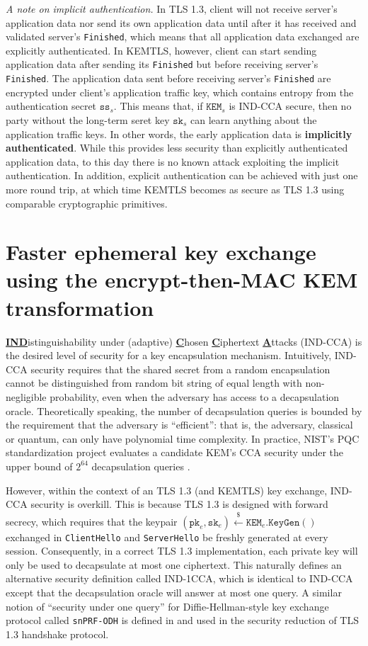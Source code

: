 \documentclass[letterpaper,12pt,titlepage,oneside,final]{book}
\newcommand{\kem}{\texttt{KEM}}
\newcommand{\pk}{\texttt{pk}}
\newcommand{\sk}{\texttt{sk}}
\newcommand{\leftsample}{\stackrel{\$}{\leftarrow}}
\begin{document}
\emph{A note on implicit authentication.} In TLS 1.3, client will not receive server's application data nor send its own application data until after it has received and validated server's \texttt{Finished}, which means that all application data exchanged are explicitly authenticated.
In KEMTLS, however, client can start sending application data after sending its \texttt{Finished} but before receiving server's \texttt{Finished}.
The application data sent before receiving server's \texttt{Finished} are encrypted under client's application traffic key, which contains entropy from the authentication secret $\texttt{ss}_s$.
This means that, if $\kem_s$ is IND-CCA secure, then no party without the long-term seret key $\sk_s$ can learn anything about the application traffic keys.
In other words, the early application data is \textbf{implicitly authenticated}.
While this provides less security than explicitly authenticated application data, to this day there is no known attack exploiting the implicit authentication.
In addition, explicit authentication can be achieved with just one more round trip, at which time KEMTLS becomes as secure as TLS 1.3 using comparable cryptographic primitives.

\chapter{Faster ephemeral key exchange using the encrypt-then-MAC KEM transformation}\label{sec:faster-tls-kex-w-ind-1cca-kem}
{\bf\underline{IND}}istinguishability under (adaptive) {\bf\underline C}hosen {\bf\underline C}iphertext {\bf\underline A}ttacks (IND-CCA) is the desired level of security for a key encapsulation mechanism. 
Intuitively, IND-CCA security requires that the shared secret from a random encapsulation cannot be distinguished from random bit string of equal length with non-negligible probability, even when the adversary has access to a decapsulation oracle.
Theoretically speaking, the number of decapsulation queries is bounded by the requirement that the adversary is ``efficient'': that is, the adversary, classical or quantum, can only have polynomial time complexity.
In practice, NIST's PQC standardization project evaluates a candidate KEM's CCA security under the upper bound of $2^{64}$ decapsulation queries \cite{nist-pqc-security-criteria}.

However, within the context of an TLS 1.3 (and KEMTLS) key exchange, IND-CCA security is overkill.
This is because TLS 1.3 is designed with forward secrecy, which requires that the keypair $(\pk_e, \sk_e)\leftsample\kem_e\texttt{.KeyGen}()$ exchanged in \texttt{ClientHello} and \texttt{ServerHello} be freshly generated at every session.
Consequently, in a correct TLS 1.3 implementation, each private key will only be used to decapsulate at most one ciphertext.
This naturally defines an alternative security definition called IND-1CCA, which is identical to IND-CCA except that the decapsulation oracle will answer at most one query.
A similar notion of ``security under one query'' for Diffie-Hellman-style key exchange protocol called \texttt{snPRF-ODH} is defined in \cite{DBLP:journals/joc/DowlingFGS21} and used in the security reduction of TLS 1.3 handshake protocol.
\end{document}
